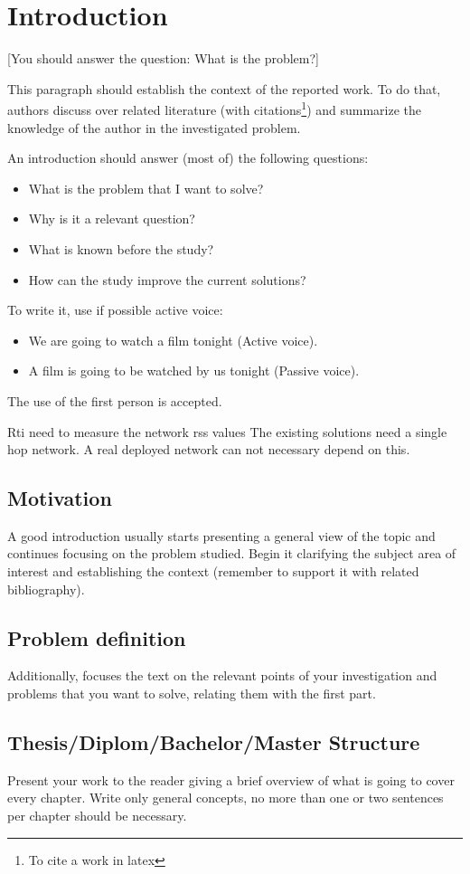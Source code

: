 \chapter{Introduction}

[You should answer the question: What is the problem?]

This paragraph should establish the context of the reported work. To do that, authors discuss over related literature (with citations\footnote{To cite a work in latex  }) and summarize the knowledge of the author in the investigated problem.

An introduction should answer (most of) the following questions:
\begin{itemize}
	\item What is the problem that I want to solve?
	\item Why is it a relevant question?
	\item What is known before the study?
	\item How can the study improve the current solutions?
\end{itemize}

To write it, use if possible active voice:
\begin{itemize}
	\item We are going to watch a film tonight (Active voice).
	\item A film is going to be watched by us tonight (Passive voice).
\end{itemize}
The use of the first person is accepted.

Rti need to measure the network rss values
The existing solutions need a single hop network.
A real deployed network can not necessary depend on this.




\section{Motivation}

A good introduction usually starts presenting a general view of the topic and continues focusing on the problem studied. Begin it clarifying the subject area of interest and establishing the context (remember to support it with related bibliography).



\section{Problem definition}
Additionally, focuses the text on the relevant points of your investigation and problems that you want to solve, relating them with the first part.




\section{Thesis/Diplom/Bachelor/Master Structure}
Present your work to the reader giving a brief overview of what is going to cover every chapter. Write only general concepts, no more than one or two sentences per chapter should be necessary. 
